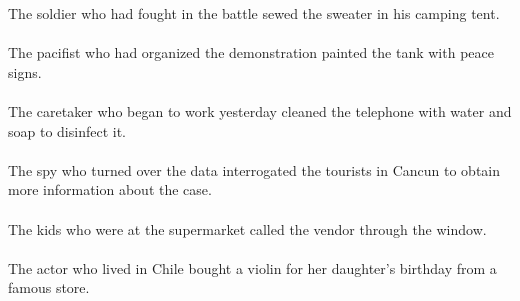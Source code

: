The soldier who had fought in the battle sewed the sweater in his camping tent.	\\	\\
The pacifist who had organized the demonstration painted the tank with peace signs.	\\	\\
The caretaker who began to work yesterday cleaned the telephone with water and soap to disinfect it.	\\	\\
The spy who turned over the data interrogated the tourists in Cancun to obtain more information about the case.	\\	\\
The kids who were at the supermarket called the vendor through the window.	\\	\\
The actor who lived in Chile bought a violin for her daughter's birthday from a famous store.	\\	\\


